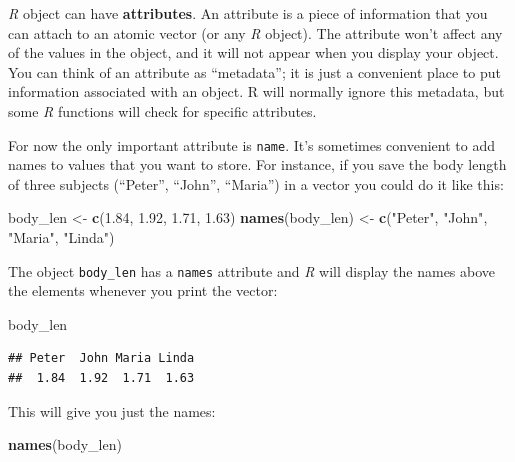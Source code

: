 \documentclass[
]{scrartcl}
\newenvironment{Shaded}{\begin{snugshade}}{\end{snugshade}}
\newcommand{\FloatTok}[1]{\textcolor[rgb]{0.00,0.00,0.81}{#1}}
\newcommand{\FunctionTok}[1]{\textcolor[rgb]{0.13,0.29,0.53}{\textbf{#1}}}
\newcommand{\NormalTok}[1]{#1}
\newcommand{\OtherTok}[1]{\textcolor[rgb]{0.56,0.35,0.01}{#1}}
\newcommand{\StringTok}[1]{\textcolor[rgb]{0.31,0.60,0.02}{#1}}
\begin{document}
\emph{R} object can have \textbf{attributes}. An attribute is a piece of information that you can attach to an atomic vector (or any \emph{R} object). The attribute won't affect any of the values in the object, and it will not appear when you display your object. You can think of an attribute as ``metadata''; it is just a convenient place to put information associated with an object. R will normally ignore this metadata, but some \emph{R} functions will check for specific attributes.

For now the only important attribute is \texttt{name}. It's sometimes convenient to add names to values that you want to store. For instance, if you save the body length of three subjects (``Peter'', ``John'', ``Maria'') in a vector you could do it like this:

\begin{Shaded}
\begin{Highlighting}[]
\NormalTok{body\_len }\OtherTok{\textless{}{-}} \FunctionTok{c}\NormalTok{(}\FloatTok{1.84}\NormalTok{, }\FloatTok{1.92}\NormalTok{, }\FloatTok{1.71}\NormalTok{, }\FloatTok{1.63}\NormalTok{)}
\FunctionTok{names}\NormalTok{(body\_len) }\OtherTok{\textless{}{-}} \FunctionTok{c}\NormalTok{(}\StringTok{"Peter"}\NormalTok{, }\StringTok{"John"}\NormalTok{, }\StringTok{"Maria"}\NormalTok{, }\StringTok{"Linda"}\NormalTok{)}
\end{Highlighting}
\end{Shaded}

The object \texttt{body\_len} has a \texttt{names} attribute and \emph{R} will display the names above the elements whenever you print the vector:

\begin{Shaded}
\begin{Highlighting}[]
\NormalTok{body\_len}
\end{Highlighting}
\end{Shaded}

\begin{verbatim}
## Peter  John Maria Linda 
##  1.84  1.92  1.71  1.63
\end{verbatim}

This will give you just the names:

\begin{Shaded}
\begin{Highlighting}[]
\FunctionTok{names}\NormalTok{(body\_len)}
\end{Highlighting}
\end{Shaded}
\end{document}
